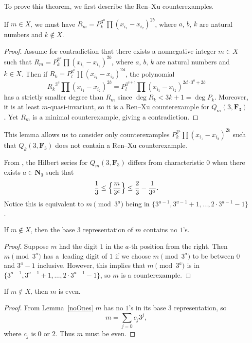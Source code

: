 To prove this theorem, we first describe the Ren--Xu counterexamples.

\begin{Lemma}\label{nonExsOnly}
 If $m\in X$, we must have $R_m=P_k^{3^a}\prod (x_{i_1}-x_{i_2})^{2b}$, where $a$, $b$, $k$ are natural numbers and $k\not \in X$.
\end{Lemma}
\begin{proof}
 Assume for contradiction that there exists a nonnegative integer $m\in X$ such that $R_m=P_k^{3^a}\prod (x_{i_1}-x_{i_2})^{2b}$, where $a$, $b$, $k$ are natural numbers and $k\in X$. Then if $R_k=P_{l}^{3^c}\prod (x_{i_1}-x_{i_2})^{2d}$, the polynomial
 \[{R_k}^{3^a}\prod (x_{i_1}-x_{i_2})^{2b} = P_{l}^{3^{a+c}}\prod (x_{i_1}-x_{i_2})^{2d\cdot 3^a + 2b}\]
 has a strictly smaller degree than $R_m$ since $\deg R_k<3k+1=\deg P_k$. Moreover, it is at least $m$-quasi-invariant, so it is a Ren--Xu counterexample for $Q_m(3,\mathbf{F}_3)$. Yet $R_m$ is a minimal counterexample, giving a contradiction.
\end{proof}

This lemma allows us to consider only counterexamples $P_k^{3^a}\prod (x_{i_1}-x_{i_2})^{2b}$ such that $Q_k(3,\mathbf{F}_3)$ does not contain a Ren--Xu counterexample.

From \cite{Ren_2020}, the Hilbert series for $Q_m(3,\mathbf{F}_3)$ differs from characteristic $0$ when there exists $a\in \mathbf{N}_0$ such that
\[\frac{1}{3}\leq \Bigl\{\frac{m}{3^a}\Bigr\}\leq \frac{2}{3}-\frac{1}{3^a}.\]
Notice this is equivalent to $m \pmod{3^a}$ being in $\bigl\{3^{a-1},3^{a-1}+1,\dots,2\cdot 3^{a-1}-1\bigr\}$.

\begin{Lemma} \label{noOnes}
 If $m\not\in X$, then the base $3$ representation of $m$ contains no $1$'s.
\end{Lemma}
\begin{proof}
 Suppose $m$ had the digit $1$ in the $a$-th position from the right. Then $m\pmod{3^a}$ has a~leading digit of $1$ if we choose $m\pmod{3^a}$ to be between $0$ and $3^a-1$ inclusive. However, this implies that $m \pmod{3^a}$ is in $\bigl\{3^{a-1},3^{a-1}+1,\dots,2\cdot 3^{a-1}-1\bigr\}$, so $m$ is a counterexample.
\end{proof}

\begin{Corollary}\label{evenCounter}
 If $m\not\in X$, then $m$ is even.
\end{Corollary}
\begin{proof}
 From Lemma~\ref{noOnes} $m$ has no $1$'s in its base $3$ representation, so
 \[m=\sum_{j=0}c_j3^j,\]
 where $c_j$ is $0$ or $2$. Thus $m$ must be even.
\end{proof}

